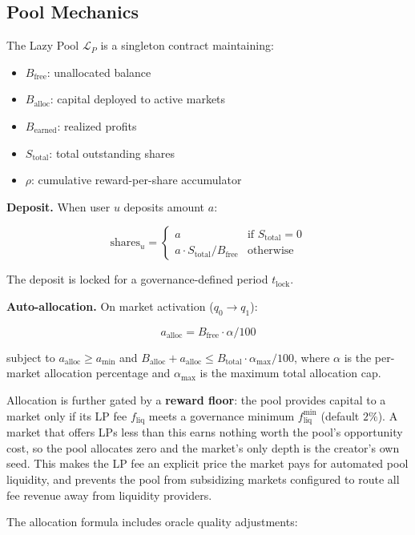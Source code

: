 \documentclass{ledger}
\theoremstyle{plain}
\theoremstyle{remark}
\begin{document}
\subsection{Pool Mechanics}\label{sec:poolmech}

The Lazy Pool $\mathcal{L}_P$ is a singleton contract maintaining:
\begin{itemize}
  \item $B_{\text{free}}$: unallocated balance
  \item $B_{\text{alloc}}$: capital deployed to active markets
  \item $B_{\text{earned}}$: realized profits
  \item $S_{\text{total}}$: total outstanding shares
  \item $\rho$: cumulative reward-per-share accumulator
\end{itemize}

\textbf{Deposit.} When user $u$ deposits amount $a$:

\[
\text{shares}_u = \begin{cases} a & \text{if } S_{\text{total}} = 0 \\
a \cdot S_{\text{total}} / B_{\text{free}} & \text{otherwise} \end{cases}
\]

The deposit is locked for a governance-defined period $t_{\text{lock}}$.

\textbf{Auto-allocation.} On market activation ($q_0 \rightarrow q_1$):

\[
a_{\text{alloc}} = B_{\text{free}} \cdot \alpha / 100
\]

subject to $a_{\text{alloc}} \geq a_{\min}$ and $B_{\text{alloc}} +
a_{\text{alloc}} \leq B_{\text{total}} \cdot \alpha_{\max} / 100$, where $\alpha$
is the per-market allocation percentage and $\alpha_{\max}$ is the maximum total
allocation cap.

Allocation is further gated by a \textbf{reward floor}: the pool provides
capital to a market only if its LP fee $f_{\text{liq}}$ meets a governance
minimum $f_{\text{liq}}^{\min}$ (default $2\%$). A market that offers LPs less
than this earns nothing worth the pool's opportunity cost, so the pool allocates
zero and the market's only depth is the creator's own seed. This makes the LP
fee an explicit price the market pays for automated pool liquidity, and prevents
the pool from subsidizing markets configured to route all fee revenue away from
liquidity providers.

The allocation formula includes oracle quality adjustments:
\end{document}

